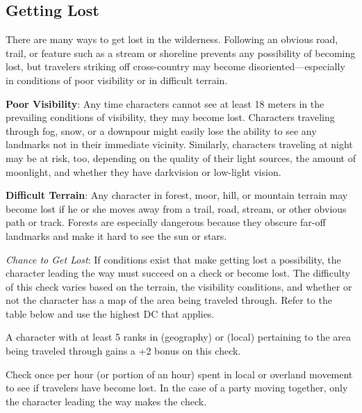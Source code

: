 \subsection{Getting Lost}
There are many ways to get lost in the wilderness. Following an obvious road, trail, or feature such as a stream or shoreline prevents any possibility of becoming lost, but travelers striking off cross-country may become disoriented---especially in conditions of poor visibility or in difficult terrain.


\textbf{Poor Visibility}: Any time characters cannot see at least 18 meters in the prevailing conditions of visibility, they may become lost. Characters traveling through fog, snow, or a downpour might easily lose the ability to see any landmarks not in their immediate vicinity. Similarly, characters traveling at night may be at risk, too, depending on the quality of their light sources, the amount of moonlight, and whether they have darkvision or low-light vision.

\textbf{Difficult Terrain}: Any character in forest, moor, hill, or mountain terrain may become lost if he or she moves away from a trail, road, stream, or other obvious path or track. Forests are especially dangerous because they obscure far-off landmarks and make it hard to see the sun or stars.

\textit{Chance to Get Lost}: If conditions exist that make getting lost a possibility, the character leading the way must succeed on a  check or become lost. The difficulty of this check varies based on the terrain, the visibility conditions, and whether or not the character has a map of the area being traveled through. Refer to the table below and use the highest DC that applies.

A character with at least 5 ranks in  (geography) or  (local) pertaining to the area being traveled through gains a +2 bonus on this check.

Check once per hour (or portion of an hour) spent in local or overland movement to see if travelers have become lost. In the case of a party moving together, only the character leading the way makes the check.


